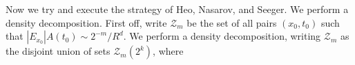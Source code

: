 Now we try and execute the strategy of Heo, Nasarov, and Seeger. We perform a density decomposition. First off, write $\mathcal{Z}_m$ be the set of all pairs $(x_0,t_0)$ such that $|E_{x_0}| A(t_0) \sim 2^{-m} / R^d$. We perform a density decomposition, writing $\mathcal{Z}_m$ as the disjoint union of sets $\mathcal{Z}_m(2^k)$, where 

\newpage

\begin{comment}

by reducing our analysis to a study of the operator in coordinates. We cover $S^d$ by a family of coordinate charts $\{ \theta \}$, and then perform a decomposition $II_W = \sum II_{W,i}$ and $Q^{\text{Low}}_W = \sum Q_{W,j}$ by applying a partition of unity to the kernels, such that the following property holds: for any two indices $i$ and $j$, such that $II_{W,i} \circ Q_{W,j} \neq 0$, there exists a coordinate system $\theta$ such that the kernels of $II_{W,i}$ and $Q_{W,j}$ both have support on a compact subset of $\theta$ (here we are using the fact that we are only looking at the \emph{small time} behaviour of the operators with respect to the wave equation, so that the kernels of the operators are supported on a small neighborhood of the diagonal). Applying the fact that the sum $\sum II_{W,i} \circ Q^{\text{Low}}_{W,j}$ is finite, it suffices to bound each term individually, and we do this by pushing forward our operator into coordinates. Let
%
\[ \mathsf{II} = II_{W,i}^\theta \quad\text{and}\quad \mathsf{Q} = Q^{\text{Low},\theta}_{W,j}. \]
%
be the pushforward operators, now defined mpaping functions on $\RR^d$ to functions on $\RR^d$. It will suffice to obtain $L^p$ estimates for $\mathsf{II} \circ \mathsf{Q}$ that are independent of $R$.

We will be aided in this analysis by an expression for the Lax parametrix in the coordinate system $\theta$.


 We will obtain bounds for this operator given some restricted bounds. So let us consider an analysis of functions of the form $S = (II_W \circ Q^{\text{Low}}_W) \{ E \}$, for some fixed measurable set $E \subset S^d$.  The pushforward operator $T_W^\theta$ has a kernel $K_\theta$ defined by an oscillatory integral distribution
%
\[ K_\theta(x,y) = a_\theta(x,y,\xi) e^{2 \pi i [ \varphi_\theta(x,y,\xi) + t |\xi_y|_{g(y)} ]}\; d\xi, \]
%
where the amplitude $a_\theta$ is a symbol of order zero, with compact $(x,y)$ support, the phase $\varphi$ is smooth, and we have
%
\[ \varphi_\theta(x,y,\xi) \approx (x - y) \cdot \xi, \]
%
in the sense that
%
\[ |\partial_x^\alpha \partial_y^\beta \partial_\xi^\lambda \{ \varphi_\theta(x,y,\xi) - (x - y) \cdot \xi \}| \lesssim |x - y|^2 |\xi|^{2 - \lambda}, \]
%
and where $|\xi|_{g(y)} = (\sum g^{ij}(y) \xi_i \xi_j )^{1/2}$ gives the length of the covector $\xi$ with respect to the Riemannian metric $g$. Let us write $\phi_\theta$ for $\varphi_\theta + t |\xi|_g$.


\end{comment}
